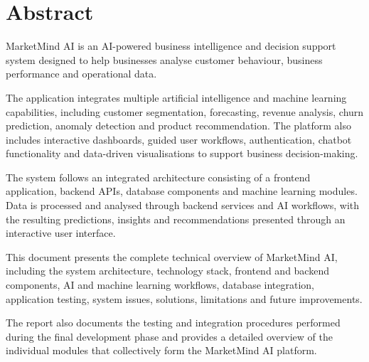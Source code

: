 \documentclass[12pt,a4paper]{report}
\begin{document}
\newpage


\chapter*{Abstract}


MarketMind AI is an AI-powered business intelligence and decision
support system designed to help businesses analyse customer behaviour,
business performance and operational data.

The application integrates multiple artificial intelligence and
machine learning capabilities, including customer segmentation,
forecasting, revenue analysis, churn prediction, anomaly detection
and product recommendation. The platform also includes interactive
dashboards, guided user workflows, authentication, chatbot
functionality and data-driven visualisations to support business
decision-making.

The system follows an integrated architecture consisting of a frontend
application, backend APIs, database components and machine learning
modules. Data is processed and analysed through backend services and
AI workflows, with the resulting predictions, insights and
recommendations presented through an interactive user interface.

This document presents the complete technical overview of MarketMind AI,
including the system architecture, technology stack, frontend and backend
components, AI and machine learning workflows, database integration,
application testing, system issues, solutions, limitations and future
improvements.

The report also documents the testing and integration procedures
performed during the final development phase and provides a detailed
overview of the individual modules that collectively form the
MarketMind AI platform.

\newpage


\tableofcontents

\newpage

\end{document}
